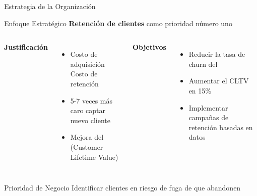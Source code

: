 
\begin{frame}{Estrategia de la Organización}
    \begin{block}{Enfoque Estratégico}
        \centering
        \textbf{Retención de clientes} como prioridad número uno
    \end{block}
    
    \begin{columns}[t]
        \textbf{Justificación}
        \begin{itemize}
            \item Costo de adquisición \highlight{>} Costo de retención
            \item 5-7 veces más caro captar nuevo cliente
            \item Mejora del  (Customer Lifetime Value)
        \end{itemize}
        
        \textbf{Objetivos}
        \begin{itemize}
            \item Reducir la tasa de churn del \churnrate
            \item Aumentar el CLTV en 15\%
            \item Implementar campañas de retención basadas en datos
        \end{itemize}
    \end{columns}
    
    \vsp
    \begin{alertblock}{Prioridad de Negocio}
        \centering
        Identificar clientes en riesgo de fuga  de que abandonen
    \end{alertblock}
\end{frame}

